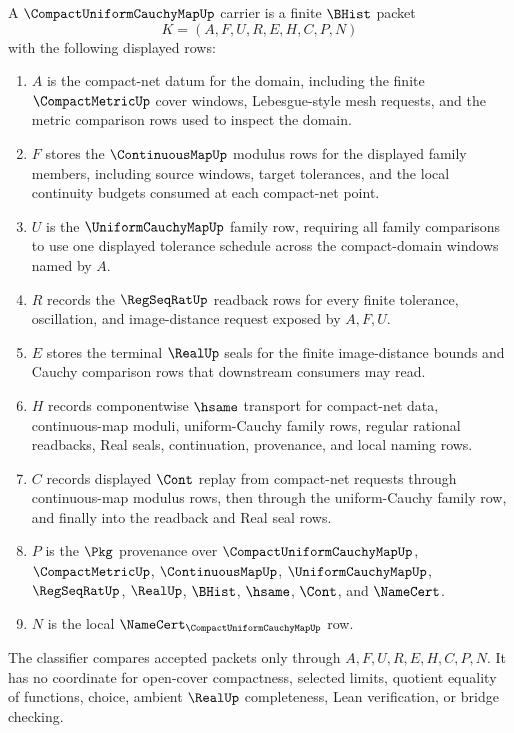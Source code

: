 \begin{definition}
\label{def:compact-uniform-cauchy-map-carrier}
A $\CompactUniformCauchyMapUp$ carrier is a finite $\BHist$ packet
$$
K=(A,F,U,R,E,H,C,P,N)
$$
with the following displayed rows:
\begin{enumerate}
\item $A$ is the compact-net datum for the domain, including the finite $\CompactMetricUp$ cover windows, Lebesgue-style mesh requests, and the metric comparison rows used to inspect the domain.
\item $F$ stores the $\ContinuousMapUp$ modulus rows for the displayed family members, including source windows, target tolerances, and the local continuity budgets consumed at each compact-net point.
\item $U$ is the $\UniformCauchyMapUp$ family row, requiring all family comparisons to use one displayed tolerance schedule across the compact-domain windows named by $A$.
\item $R$ records the $\RegSeqRatUp$ readback rows for every finite tolerance, oscillation, and image-distance request exposed by $A,F,U$.
\item $E$ stores the terminal $\RealUp$ seals for the finite image-distance bounds and Cauchy comparison rows that downstream consumers may read.
\item $H$ records componentwise $\hsame$ transport for compact-net data, continuous-map moduli, uniform-Cauchy family rows, regular rational readbacks, Real seals, continuation, provenance, and local naming rows.
\item $C$ records displayed $\Cont$ replay from compact-net requests through continuous-map modulus rows, then through the uniform-Cauchy family row, and finally into the readback and Real seal rows.
\item $P$ is the $\Pkg$ provenance over $\CompactUniformCauchyMapUp$, $\CompactMetricUp$, $\ContinuousMapUp$, $\UniformCauchyMapUp$, $\RegSeqRatUp$, $\RealUp$, $\BHist$, $\hsame$, $\Cont$, and $\NameCert$.
\item $N$ is the local $\NameCert_{\CompactUniformCauchyMapUp}$ row.
\end{enumerate}
The classifier compares accepted packets only through $A,F,U,R,E,H,C,P,N$. It has no coordinate for open-cover compactness, selected limits, quotient equality of functions, choice, ambient $\RealUp$ completeness, Lean verification, or bridge checking.
\end{definition}

